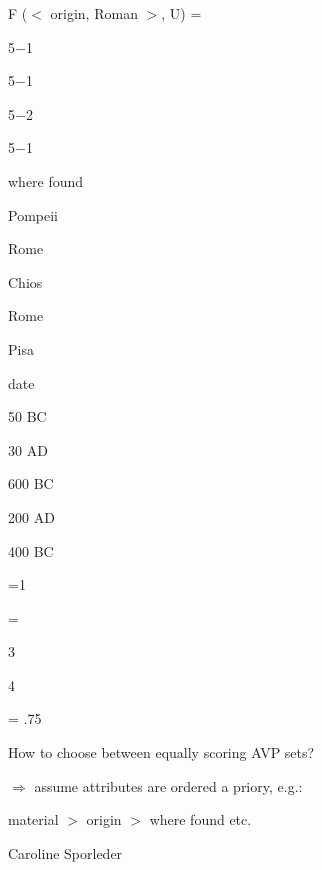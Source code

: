 \documentclass[compress,color=usenames]{beamer}
\begin{document}
\begin{frame}
F ($<$ origin, Roman $>$, U) =





5$-$1


5$-$1


5$-$2


5$-$1






where found



Pompeii



Rome



Chios



Rome



Pisa






date



50 BC



30 AD



600 BC



200 AD



400 BC





=1


=





3


4





= .75






How to choose between equally scoring AVP sets?



$\Rightarrow$ assume attributes are ordered a priory, e.g.:



material $>$ origin $>$ where found etc.



Caroline Sporleder














\end{frame}
\end{document}
